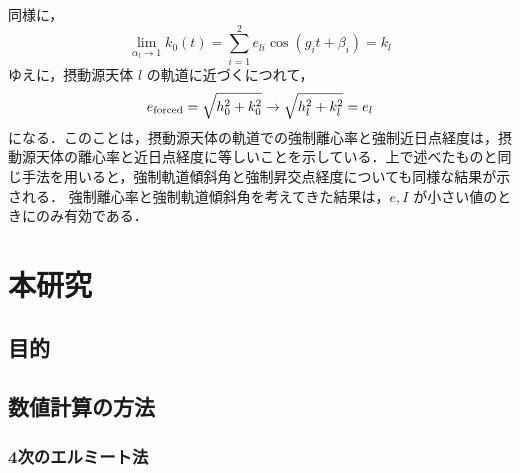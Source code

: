 \documentclass[11pt,a4paper,oneside,onecolumn]{jreport}
\begin{document}
同様に，
\begin{equation}
\lim_{\alpha_l \rightarrow 1} k_0 (t) = \sum_{i = 1}^2 e_{li} \cos (g_i t + \beta_i) = k_l
\end{equation}
ゆえに，摂動源天体 $l$ の軌道に近づくにつれて，
\begin{equation}
e_{\rm forced} = \sqrt{h_0^2 + k_0^2} \rightarrow \sqrt{h_l^2 + k_l^2} = e_l 
\end{equation}
になる．このことは，摂動源天体の軌道での強制離心率と強制近日点経度は，摂動源天体の離心率と近日点経度に等しいことを示している．上で述べたものと同じ手法を用いると，強制軌道傾斜角と強制昇交点経度についても同様な結果が示される．
強制離心率と強制軌道傾斜角を考えてきた結果は，$e, I$ が小さい値のときにのみ有効である．

\chapter{本研究}
\section{目的}


\section{数値計算の方法}
\subsection{4次のエルミート法 \label{sec:Hermite}}
\end{document}
